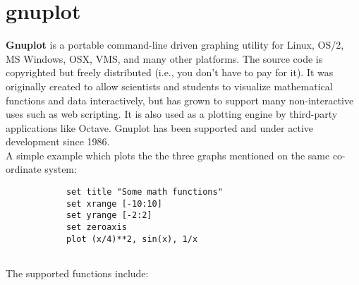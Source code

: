 
\section{gnuplot}
		\textbf{Gnuplot} is a portable command-line driven graphing utility for Linux, OS/2, MS Windows, OSX, VMS, and many other platforms. The source code is copyrighted but freely distributed (i.e., you don't have to pay for it). It was originally created to allow scientists and students to visualize mathematical functions and data interactively, but has grown to support many non-interactive uses such as web scripting. It is also used as a plotting engine by third-party applications like Octave. Gnuplot has been supported and under active development since 1986. \\
		
		A simple example which plots the the three graphs mentioned on the same co-ordinate system:
		\begin{verbatim}
			set title "Some math functions"
			set xrange [-10:10]
			set yrange [-2:2]
			set zeroaxis
			plot (x/4)**2, sin(x), 1/x
			
		\end{verbatim}
		The supported functions include: 
